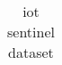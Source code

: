 \begin{table}[!h]
\begin{tabular}{l|l|l}
        
        
    \bottomrule        
    \end{tabular}
    \caption{iot sentinel dataset}
    \label{tab:iotdataset}
\end{table}


